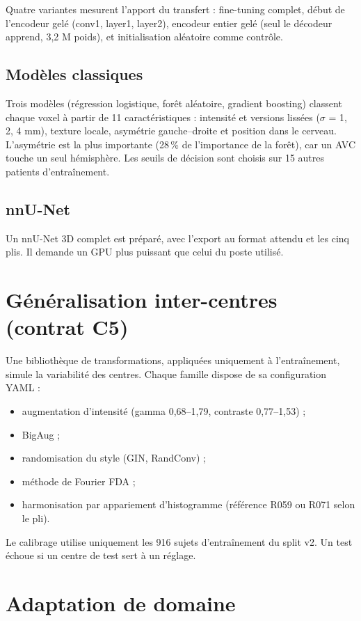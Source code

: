 \documentclass[11pt,a4paper]{report}
\begin{document}
Quatre variantes mesurent l'apport du transfert : fine-tuning complet, début
de l'encodeur gelé (conv1, layer1, layer2), encodeur entier gelé (seul le
décodeur apprend, 3,2 M poids), et initialisation aléatoire comme contrôle.

\subsection{Modèles classiques}

Trois modèles (régression logistique, forêt aléatoire, gradient boosting)
classent chaque voxel à partir de 11 caractéristiques : intensité et versions
lissées ($\sigma$ = 1, 2, 4 mm), texture locale, asymétrie gauche--droite et
position dans le cerveau. L'asymétrie est la plus importante (28\,\% de
l'importance de la forêt), car un AVC touche un seul hémisphère. Les seuils
de décision sont choisis sur 15 autres patients d'entraînement.

\subsection{nnU-Net}

Un nnU-Net 3D complet est préparé, avec l'export au format attendu et les
cinq plis. Il demande un GPU plus puissant que celui du poste utilisé.

\section{Généralisation inter-centres (contrat C5)}

Une bibliothèque de transformations, appliquées uniquement à l'entraînement,
simule la variabilité des centres. Chaque famille dispose de sa
configuration YAML :
\begin{itemize}
  \item augmentation d'intensité (gamma 0,68--1,79, contraste 0,77--1,53) ;
  \item BigAug ;
  \item randomisation du style (GIN, RandConv) ;
  \item méthode de Fourier FDA ;
  \item harmonisation par appariement d'histogramme (référence R059 ou R071
        selon le pli).
\end{itemize}
Le calibrage utilise uniquement les 916 sujets d'entraînement du split v2. Un
test échoue si un centre de test sert à un réglage.

\section{Adaptation de domaine}
\end{document}
